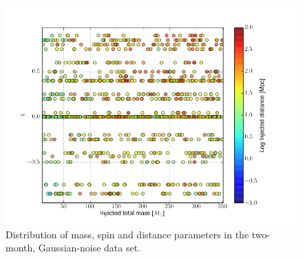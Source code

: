 \begin{figure}
  \includegraphics[width=\linewidth]{figures/ninja2/ninja2_dataset.png}
  \caption[Parameters of the NINJA-2 two-month data set]{
  \label{f:ninja2_dataset}
Distribution of mass, spin and distance parameters in the two-month,
Gaussian-noise data set.
}
\end{figure}%




